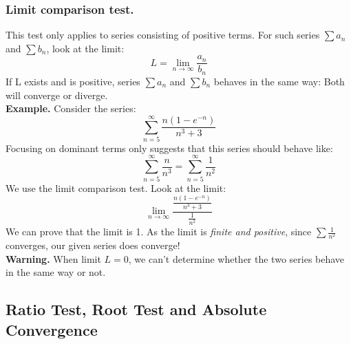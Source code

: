 \documentclass{article}
\begin{document}
\subsubsection{Limit comparison test.} 
This test only applies to series consisting of positive terms. For such series $ \sum a_n$ and $\sum b_n$, look at the limit: 
$$ L = \lim_{n\to\infty} \frac{a_n}{b_n}$$
If L exists and is positive, series $ \sum a_n$ and $\sum b_n$ behaves in the same way: Both will converge or diverge. \\
\textbf{Example.} Consider the series: 
$$\sum_{n=5}^{\infty} \frac{n(1-e^{-n})}{n^3 + 3}$$
Focusing on dominant terms only suggests that this series should behave like: 
$$ \sum_{n=5}^{\infty} \frac{n}{n^3} = \sum_{n=5}^{\infty} \frac{1}{n^2}$$
We use the limit comparison test. Look at the limit: 
$$\lim_{n\to\infty} \frac{\frac{n(1-e^{-n})}{n^3 + 3}}{\frac{1}{n^2}}$$
We can prove that the limit is 1. As the limit is \textit{finite and positive}, since $\sum \frac{1}{n^2}$ converges, our given series does converge! \\
\textbf{Warning.} When limit $L = 0$, we can't determine whether the two series behave in the same way or not. 

\subsection{Ratio Test, Root Test and Absolute Convergence}
\end{document}

